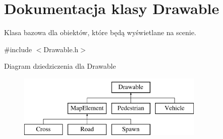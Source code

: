 \hypertarget{class_drawable}{\section{Dokumentacja klasy Drawable}
\label{class_drawable}
}


Klasa bazowa dla obiektów, które będą wyświetlane na scenie.  




{\ttfamily \#include $<$Drawable.\-h$>$}

Diagram dziedziczenia dla Drawable\begin{figure}[H]
\begin{center}
\leavevmode
\includegraphics[height=3.000000cm]{class_drawable}
\end{center}
\end{figure}
